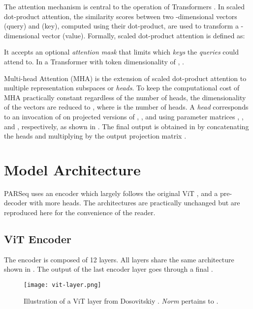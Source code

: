 The attention mechanism is central to the operation of Transformers \cite{vaswani2017attention}. In scaled dot-product attention, the similarity scores between two -dimensional vectors  (query) and  (key), computed using their dot-product, are used to transform a -dimensional vector  (value). Formally, scaled dot-product attention is defined as:

It accepts an optional \textit{attention mask} that limits which \textit{keys} the \textit{queries} could attend to. In a Transformer with token dimensionality of , .

Multi-head Attention (MHA) is the extension of scaled dot-product attention to multiple representation subspaces or \textit{heads}. To keep the computational cost of MHA practically constant regardless of the number of heads, the dimensionality of the vectors are reduced to , where  is the number of heads. A \textit{head} corresponds to an invocation of  on projected versions of , , and  using parameter matrices , , and , respectively, as shown in . The final output is obtained in  by concatenating the heads and multiplying by the output projection matrix .






\section{Model Architecture}
\label{ch:arch-appendix}

PARSeq uses an encoder which largely follows the original ViT \cite{dosovitskiy2020image}, and a pre- \cite{baevski2018adaptive,wang2019learning} decoder with more heads. The architectures are practically unchanged but are reproduced here for the convenience of the reader.

\subsection{ViT Encoder}

The encoder is composed of 12 layers. All layers share the same architecture shown in . The output of the last encoder layer goes through a final .

\begin{figure}[ht]
  \centering
  \texttt{[image: vit-layer.png]}
   \caption[Illustration of a ViT layer.]{Illustration of a ViT layer from Dosovitskiy \etal \cite{dosovitskiy2020image}. \textit{Norm} pertains to .}
   \label{fig:vit-arch}
\end{figure}

